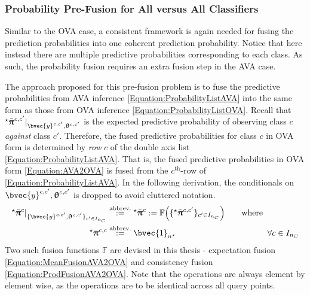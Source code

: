 			\subsubsection{Probability Pre-Fusion for All versus All Classifiers}
			\label{BenthicHabitatMapping:Classification:MulticlassClassification:ProbabilityPreFusion}
						
				Similar to the OVA case, a consistent framework is again needed for fusing the prediction probabilities into one coherent prediction probability. Notice that here instead there are multiple predictive probabilities corresponding to each class. As such, the probability fusion requires an extra fusion step in the AVA case. 
			
				The approach proposed for this pre-fusion problem is to fuse the predictive probabilities from AVA inference \eqref{Equation:ProbabilityListAVA} into the same form as those from OVA inference \eqref{Equation:ProbabilityListOVA}. Recall that ${^{\star}}\bar{\vec{\uppi}}^{c, c'} |_{\bvec{y}^{c, c'}, \vec{\uptheta}^{c, c'}}$ is the expected predictive probability of observing class $c$ \textit{against} class $c'$. Therefore, the fused predictive probabilities for class $c$ in OVA form is determined by \textit{row} $c$ of the double axis list \eqref{Equation:ProbabilityListAVA}. That is, the fused predictive probabilities in OVA form \eqref{Equation:AVA2OVA} is fused from the $c^{\mathrm{th}}$-row of \eqref{Equation:ProbabilityListAVA}. In the following derivation, the conditionals on $\bvec{y}^{c, c'}, \vec{\uptheta}^{c, c'}$ is dropped to avoid cluttered notation. \begin{equation}
					\begin{aligned}
						{^{\star}}\bar{\vec{\uppi}}^{c} |_{\{ \bvec{y}^{c, c'}, \vec{\uptheta}^{c, c'} \}_{c' \in I_{n_{C}}}} &\stackrel{\text{abbrev.}}{:=} {^{\star}}\bar{\vec{\uppi}}^{c} := \mathbb{F}\Big(\{{^{\star}}\bar{\vec{\uppi}}^{c, c'}\}_{c' \in I_{n_{C}}}\Big) \qquad \text{where} \\
						{^{\star}}\bar{\vec{\uppi}}^{c, c} &\stackrel{\text{abbrev.}}{:=} \bvec{1}_{n^{\star}} \qquad \qquad \qquad \qquad \quad \qquad \forall c \in I_{n_{C}}
					\end{aligned}
				\label{Equation:AVA2OVA}
				\end{equation} Two such fusion functions $\mathbb{F}$ are devised in this thesis - expectation fusion \eqref{Equation:MeanFusionAVA2OVA} and consistency fusion \eqref{Equation:ProdFusionAVA2OVA}. Note that the operations are always element by element wise, as the operations are to be identical across all query points.
				
